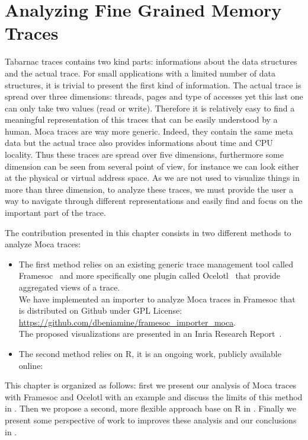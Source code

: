 \chapter{Analyzing Fine Grained Memory Traces}

\gls{Tabarnac} traces contains two kind parts: informations about the data structures and the actual trace.
For small applications with a limited number of data structures, it is trivial to present the first kind of information.
The actual trace is spread over three dimensions: threads, pages and type of accesses yet this last one can only take two values (read or write).
Therefore it is relatively easy to find a meaningful representation of this traces that can be easily understood by a human.
\gls{Moca} traces are way more generic.
Indeed, they contain the same meta data but the actual trace also provides informations about time and \gls{CPU} locality.
Thus these traces are spread over five dimensions, furthermore some dimension can be seen from several point of view, for instance we can look either at the physical or virtual address space.
As we are not used to visualize things in more than three dimension, to analyze these traces, we must provide the user a way to navigate through different representations and easily find and focus on the important part of the trace.

The contribution presented in this chapter consists in two different methods to analyze \gls{Moca} traces:
\begin{itemize}
    \item The first method relies on an existing generic trace management tool called \gls{Framesoc}~\cite{Pagano14frameSoC} and more specifically one plugin called \gls{Ocelotl}~\cite{Dosimont14Ocelotl} that provide aggregated views of a trace.\\
        We have implemented an importer to analyze \gls{Moca} traces in \gls{Framesoc} that is distributed on Github under GPL License:\\
        \url{https://github.com/dbeniamine/framesoc\_importer\_moca}.\\
        The proposed visualizations are presented in an Inria Research Report~\cite{Beniamine15Memory}.
    \item The second method relies on \gls{R}, it is an ongoing work, publicly available online:
\end{itemize}

This chapter is organized as follows: first we present our analysis of \gls{Moca} traces with \gls{Framesoc} and \gls{Ocelotl} with an example and discuss the limits of this method in .
Then we propose a second, more flexible approach base on \gls{R} in .
Finally we present some perspective of work to improves these analysis and our conclusions in .


